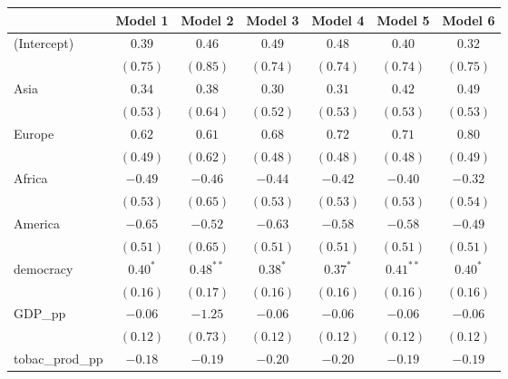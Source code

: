 
\begin{table}[!h]
\begin{center}
\begin{tabular}{l c c c c c c }
\toprule
 & Model 1 & Model 2 & Model 3 & Model 4 & Model 5 & Model 6 \\
\midrule
(Intercept)             & $0.39$       & $0.46$       & $0.49$       & $0.48$       & $0.40$       & $0.32$       \\
                        & $(0.75)$     & $(0.85)$     & $(0.74)$     & $(0.74)$     & $(0.74)$     & $(0.75)$     \\
Asia                    & $0.34$       & $0.38$       & $0.30$       & $0.31$       & $0.42$       & $0.49$       \\
                        & $(0.53)$     & $(0.64)$     & $(0.52)$     & $(0.53)$     & $(0.53)$     & $(0.53)$     \\
Europe                  & $0.62$       & $0.61$       & $0.68$       & $0.72$       & $0.71$       & $0.80$       \\
                        & $(0.49)$     & $(0.62)$     & $(0.48)$     & $(0.48)$     & $(0.48)$     & $(0.49)$     \\
Africa                  & $-0.49$      & $-0.46$      & $-0.44$      & $-0.42$      & $-0.40$      & $-0.32$      \\
                        & $(0.53)$     & $(0.65)$     & $(0.53)$     & $(0.53)$     & $(0.53)$     & $(0.54)$     \\
America                 & $-0.65$      & $-0.52$      & $-0.63$      & $-0.58$      & $-0.58$      & $-0.49$      \\
                        & $(0.51)$     & $(0.65)$     & $(0.51)$     & $(0.51)$     & $(0.51)$     & $(0.51)$     \\
democracy               & $0.40^{*}$   & $0.48^{**}$  & $0.38^{*}$   & $0.37^{*}$   & $0.41^{**}$  & $0.40^{*}$   \\
                        & $(0.16)$     & $(0.17)$     & $(0.16)$     & $(0.16)$     & $(0.16)$     & $(0.16)$     \\
GDP\_pp                 & $-0.06$      & $-1.25$      & $-0.06$      & $-0.06$      & $-0.06$      & $-0.06$      \\
                        & $(0.12)$     & $(0.73)$     & $(0.12)$     & $(0.12)$     & $(0.12)$     & $(0.12)$     \\
tobac\_prod\_pp         & $-0.18$      & $-0.19$      & $-0.20$      & $-0.20$      & $-0.19$      & $-0.19$      \\

\end{tabular}
\end{center}
\end{table}
